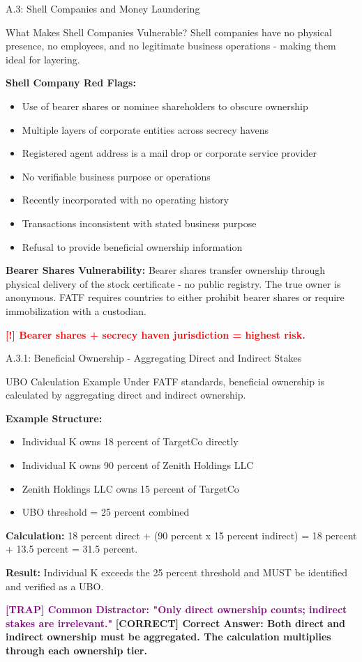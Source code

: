\documentclass[11pt,a4paper]{beamer}
\newcommand{\redflag}[1]{\textcolor{red}{\textbf{[!] #1}}}
\newcommand{\trap}[1]{\textcolor{purple}{\textbf{[TRAP] #1}}}
\newcommand{\correct}[1]{\textcolor{green!50!black}{\textbf{[CORRECT] #1}}}
\begin{document}
	\begin{frame}{A.3: Shell Companies and Money Laundering}
		\begin{block}{What Makes Shell Companies Vulnerable?}
			Shell companies have no physical presence, no employees, and no legitimate business operations - making them ideal for layering.
		\end{block}
		\textbf{Shell Company Red Flags:}
		\begin{itemize}
			\item Use of bearer shares or nominee shareholders to obscure ownership
			\item Multiple layers of corporate entities across secrecy havens
			\item Registered agent address is a mail drop or corporate service provider
			\item No verifiable business purpose or operations
			\item Recently incorporated with no operating history
			\item Transactions inconsistent with stated business purpose
			\item Refusal to provide beneficial ownership information
		\end{itemize}
		\textbf{Bearer Shares Vulnerability:}
		Bearer shares transfer ownership through physical delivery of the stock certificate - no public registry. The true owner is anonymous. FATF requires countries to either prohibit bearer shares or require immobilization with a custodian.
		
		\redflag{Bearer shares + secrecy haven jurisdiction = highest risk.}
	\end{frame}
	
	\begin{frame}{A.3.1: Beneficial Ownership - Aggregating Direct and Indirect Stakes}
		\begin{block}{UBO Calculation Example}
			Under FATF standards, beneficial ownership is calculated by aggregating direct and indirect ownership.
		\end{block}
		\textbf{Example Structure:}
		\begin{itemize}
			\item Individual K owns 18 percent of TargetCo directly
			\item Individual K owns 90 percent of Zenith Holdings LLC
			\item Zenith Holdings LLC owns 15 percent of TargetCo
			\item UBO threshold = 25 percent combined
		\end{itemize}
		\textbf{Calculation:}
		18 percent direct + (90 percent x 15 percent indirect) = 18 percent + 13.5 percent = 31.5 percent.
		
		\vspace{0.1cm}
		\textbf{Result:} Individual K exceeds the 25 percent threshold and MUST be identified and verified as a UBO.
		
		\trap{Common Distractor: "Only direct ownership counts; indirect stakes are irrelevant."}
		\correct{Correct Answer: Both direct and indirect ownership must be aggregated. The calculation multiplies through each ownership tier.}
	\end{frame}
	
\end{document}
